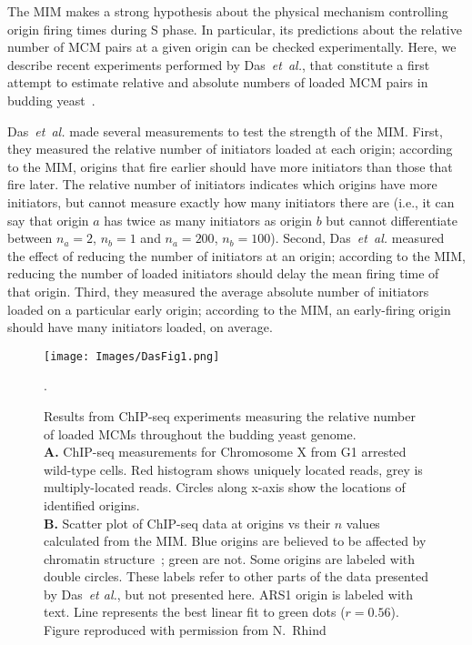 {	The MIM makes a strong hypothesis about the physical mechanism controlling origin firing times during S phase.
	In particular, its predictions about the relative number of MCM pairs at a given origin can be checked experimentally.
	Here, we describe recent experiments performed by Das~\emph{et~al.}, that constitute a first attempt to estimate relative and absolute numbers of loaded MCM pairs in budding yeast~\cite{Rhind}.
	
	Das~\emph{et~al.} made several measurements to test the strength of the MIM.
	First, they measured the relative number of initiators loaded at each origin; according to the MIM, origins that fire earlier should have more initiators than those that fire later.
	The relative number of initiators indicates which origins have more initiators, but cannot measure exactly how many initiators there are (i.e., it can say that origin $a$ has twice as many initiators as origin $b$ but cannot differentiate between $n_a=2$, $n_b=1$ and $n_a=200$, $n_b=100$).
	Second, Das~\emph{et~al.} measured the effect of reducing the number of initiators at an origin; according to the MIM, reducing the number of loaded initiators should delay the mean firing time of that origin.
	Third, they measured the average absolute number of initiators loaded on a particular early origin; according to the MIM, an early-firing origin should have many initiators loaded, on average.
		
		\begin{figure}[tbh!]
			\begin{center}
				\texttt{[image: Images/DasFig1.png]}
			\end{center}
				\caption[CHiP-seq Measurements of MCM on Chromosome X]{\label{fig:Das1} Results from ChIP-seq experiments measuring the relative number of loaded MCMs throughout the budding yeast genome.\\
					\textbf{A.} ChIP-seq measurements for Chromosome X from G1 arrested wild-type cells.
					Red histogram shows uniquely located reads, grey is multiply-located reads.
					Circles along x-axis show the locations of identified origins.\\
					\textbf{B.} Scatter plot of ChIP-seq data at origins vs their $n$ values calculated from the MIM.
					Blue origins are believed to be affected by chromatin structure~\cite{Chromatin}; green are not.
					Some origins are labeled with double circles.
					These labels refer to other parts of the data presented by Das~\emph{et al.}, but not presented here.
					ARS1 origin is labeled with text.
					Line represents the best linear fit to green dots ($r=0.56$).
					Figure reproduced with permission from N.~Rhind~\cite{Rhind}}.
		\end{figure}
	
}
